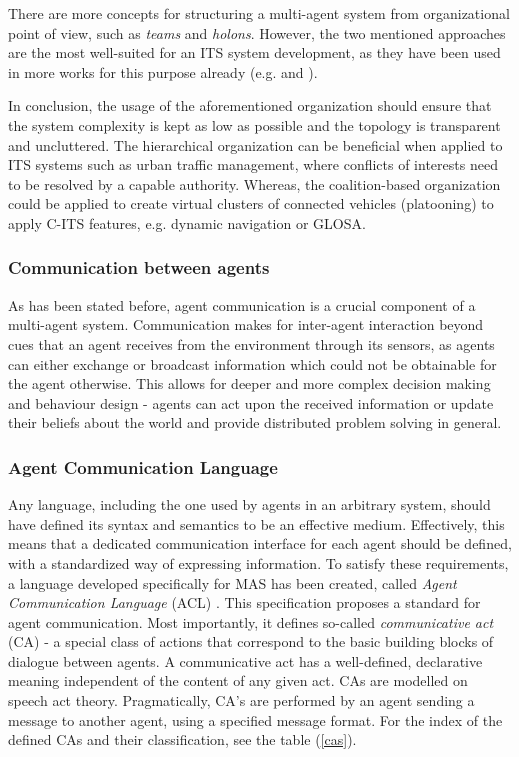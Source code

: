 \documentclass[main.tex]{subfiles}
\begin{document}
There are more concepts for structuring a multi-agent system from organizational point of view, 
such as \emph{teams} and \emph{holons}. However, the two mentioned approaches are the most well-suited for 
an ITS system development, as they have been used in more works for this purpose already 
(e.g. \cite{Balaji2007} and \cite{Vijsel2004}). 

In conclusion, the usage of the aforementioned organization should ensure that the system complexity 
is kept as low as possible and the topology is transparent and uncluttered. The hierarchical 
organization can be beneficial when applied to ITS systems such as urban traffic management, where 
conflicts of interests need to be resolved by a capable authority. Whereas, the coalition-based 
organization could be applied to create virtual clusters of connected vehicles (platooning) to apply 
C-ITS features, e.g. dynamic navigation or GLOSA.

\subsubsection{Communication between agents}

As has been stated before, agent communication is a crucial component of a multi-agent system. 
Communication makes for inter-agent interaction beyond cues that an agent receives from the environment 
through its sensors, as agents can either exchange or broadcast information which could not be obtainable 
for the agent otherwise. This allows for deeper and more complex decision making and behaviour design - 
agents can act upon the received information or update their beliefs about the world and provide 
distributed problem solving in general. 

\subsubsection{Agent Communication Language}

Any language, including the one used by agents in an arbitrary system, should have defined its syntax and 
semantics to be an effective medium. Effectively, this means that a dedicated communication
interface for each agent should be defined, with a standardized way of expressing information. 
To satisfy these requirements, a language developed specifically for MAS has been created, 
called \emph{Agent Communication Language} (ACL) \cite{IntelligentPhysicalAgents2001}. 
This specification proposes a standard for agent communication. Most importantly, it defines 
so-called \emph{communicative act} (CA) - a special class of actions that correspond to the basic
building blocks of dialogue between agents. A communicative act has a well-defined, declarative
meaning independent of the content of any given act. CAs are modelled on speech act theory.
Pragmatically, CA's are performed by an agent sending a message to another agent, using a
specified message format. For the index of the defined CAs and their classification, see the
table (\ref{cas}).
\end{document}
